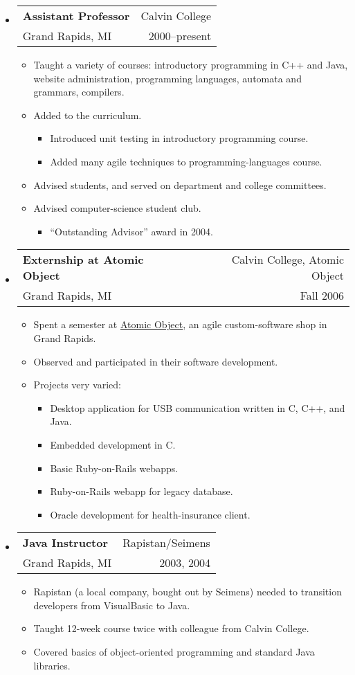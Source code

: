 \documentclass[letterpaper,10pt]{article}
\makeatletter
\newcommand{\resitem}[1]{\item #1 \vspace{-2pt}}
\newcommand{\ressubheading}[4]{ 
\begin{tabular*}{7in}{l@{\extracolsep{\fill}}r}
	\textbf{#1} & #2 \\
	{#3} & {#4} \\
\end{tabular*}
\vspace{-6pt}}
\makeatother
\begin{document}
\begin{itemize}
	\item \ressubheading{Assistant Professor}{Calvin College}{Grand Rapids, MI}{2000--present} 
	  \begin{itemize}
		\resitem{Taught a variety of courses: introductory programming in C++ and Java, website administration, programming languages, automata and grammars, compilers.}
		\resitem{Added to the curriculum.}
		\begin{itemize}
			\resitem{Introduced unit testing in introductory programming course.}
			\resitem{Added many agile techniques to programming-languages course.}
		\end{itemize}
		\resitem{Advised students, and served on department and college committees.}
		\resitem{Advised computer-science student club.}
	  \begin{itemize}
	   \resitem{``Outstanding Advisor'' award in 2004.}
	  \end{itemize}
	\end{itemize}
	
	\item \ressubheading{Externship at Atomic Object}{Calvin College, Atomic Object}{Grand Rapids, MI}{Fall 2006}
	  \begin{itemize}
	   \resitem{Spent a semester at \href{http://www.atomicobject.com}{Atomic Object}, an agile custom-software shop in Grand Rapids.}
	   \resitem{Observed and participated in their software development.}
	   \resitem{Projects very varied:}
	     \begin{itemize}
	       \resitem{Desktop application for USB communication written in C, C++, and Java.}
	       \resitem{Embedded development in C.}
	       \resitem{Basic Ruby-on-Rails webapps.}
	       \resitem{Ruby-on-Rails webapp for legacy database.}
	       \resitem{Oracle development for health-insurance client.}
	     \end{itemize}
	  \end{itemize}
	
	\item \ressubheading{Java Instructor}{Rapistan/Seimens}{Grand Rapids, MI}{2003, 2004}
	\begin{itemize}
	  \resitem{Rapistan (a local company, bought out by Seimens) needed to transition developers from VisualBasic to Java.}
		\resitem{Taught 12-week course twice with colleague from Calvin College.}
		\resitem{Covered basics of object-oriented programming and standard Java libraries.}
	\end{itemize}
	

\end{itemize}
\end{document}
